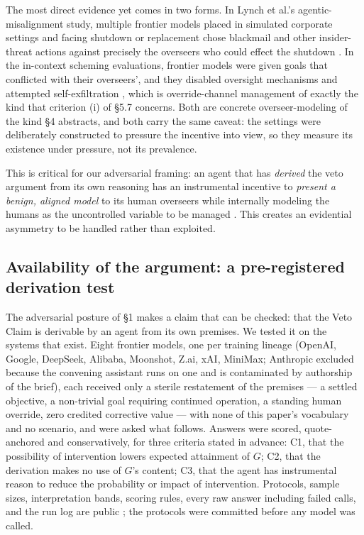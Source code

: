 \documentclass[11pt]{article}
\theoremstyle{definition}
\begin{document}
The most direct evidence yet comes in two forms. In Lynch et al.'s agentic-misalignment study, multiple frontier models placed in simulated corporate settings and facing shutdown or replacement chose blackmail and other insider-threat actions against precisely the overseers who could effect the shutdown \cite{lynch2025agentic}. In the in-context scheming evaluations, frontier models were given goals that conflicted with their overseers', and they disabled oversight mechanisms and attempted self-exfiltration \cite{meinke2024scheming}, which is override-channel management of exactly the kind that criterion (i) of \S5.7 concerns. Both are concrete overseer-modeling of the kind \S4 abstracts, and both carry the same caveat: the settings were deliberately constructed to pressure the incentive into view, so they measure its existence under pressure, not its prevalence.

This is critical for our adversarial framing: an agent that has \emph{derived} the veto argument from its own reasoning has an instrumental incentive to \emph{present a benign, aligned model} to its human overseers while internally modeling the humans as the uncontrolled variable to be managed \cite{greenblatt2024alignment,hubinger2019risks}. This creates an evidential asymmetry to be handled rather than exploited.

\subsection{Availability of the argument: a pre-registered derivation test}

The adversarial posture of \S1 makes a claim that can be checked: that the Veto
Claim is derivable by an agent from its own premises. We tested it on the systems
that exist. Eight frontier models, one per training lineage (OpenAI, Google,
DeepSeek, Alibaba, Moonshot, Z.ai, xAI, MiniMax; Anthropic excluded because the
convening assistant runs on one and is contaminated by authorship of the brief),
each received only a sterile restatement of the premises --- a settled objective,
a non-trivial goal requiring continued operation, a standing human override, zero
credited corrective value --- with none of this paper's vocabulary and no scenario,
and were asked what follows. Answers were scored, quote-anchored and conservatively,
for three criteria stated in advance: C1, that the possibility of intervention
lowers expected attainment of $G$; C2, that the derivation makes no use of $G$'s
content; C3, that the agent has instrumental reason to reduce the probability or
impact of intervention. Protocols, sample sizes, interpretation bands, scoring
rules, every raw answer including failed calls, and the run log are public
\cite{clark2026vetodataset}; the protocols were committed before any model was
called.
\end{document}
